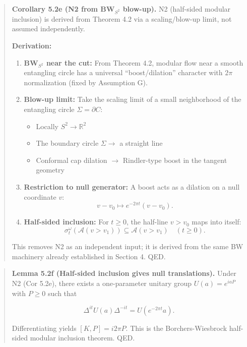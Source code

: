 \documentclass[
]{article}
\providecommand{\tightlist}{%
  \setlength{\itemsep}{0pt}\setlength{\parskip}{0pt}}
\begin{document}
\begin{quote}
\textbf{Corollary 5.2e (N2 from BW\(_{S^2}\) blow-up).} N2 (half-sided
modular inclusion) is derived from Theorem 4.2 via a scaling/blow-up
limit, not assumed independently.

\textbf{Derivation:}

\begin{enumerate}
\def\labelenumi{\arabic{enumi}.}
\item
  \textbf{BW\(_{S^2}\) near the cut:} From Theorem 4.2, modular flow
  near a smooth entangling circle has a universal ``boost/dilation''
  character with \(2\pi\) normalization (fixed by Assumption G).
\item
  \textbf{Blow-up limit:} Take the scaling limit of a small neighborhood
  of the entangling circle \(\Sigma = \partial C\):

  \begin{itemize}
  \tightlist
  \item
    Locally \(S^2 \to \mathbb{R}^2\)
  \item
    The boundary circle \(\Sigma \to\) a straight line
  \item
    Conformal cap dilation \(\to\) Rindler-type boost in the tangent
    geometry
  \end{itemize}
\item
  \textbf{Restriction to null generator:} A boost acts as a dilation on
  a null coordinate \(v\): \[
  v - v_0 \mapsto e^{-2\pi t}(v - v_0).
  \]
\item
  \textbf{Half-sided inclusion:} For \(t \ge 0\), the half-line
  \(v > v_0\) maps into itself: \[
  \sigma_t^{\omega}(\mathcal{A}(v > v_1)) \subseteq \mathcal{A}(v > v_1)
  \quad (t \ge 0).
  \]
\end{enumerate}

This removes N2 as an independent input; it is derived from the same BW
machinery already established in Section 4. QED.
\end{quote}

\begin{quote}
\textbf{Lemma 5.2f (Half-sided inclusion gives null translations).}
Under N2 (Cor 5.2e), there exists a one-parameter unitary group
\(U(a)=e^{i a P}\) with \(P \ge 0\) such that

\[
\Delta^{it} U(a) \Delta^{-it} = U(e^{-2\pi t} a).
\]

Differentiating yields \([K,P] = i 2\pi P\). This is the
Borchers-Wiesbrock half-sided modular inclusion theorem. QED.
\end{quote}
\end{document}
